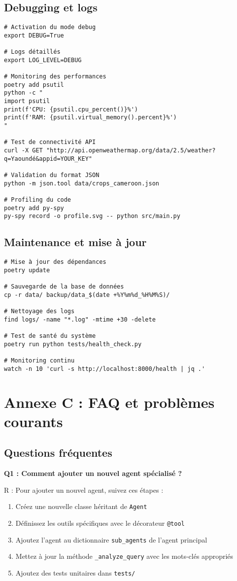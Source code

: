 \subsection{Debugging et logs}
\begin{verbatim}
# Activation du mode debug
export DEBUG=True

# Logs détaillés
export LOG_LEVEL=DEBUG

# Monitoring des performances
poetry add psutil
python -c "
import psutil
print(f'CPU: {psutil.cpu_percent()}%')
print(f'RAM: {psutil.virtual_memory().percent}%')
"

# Test de connectivité API
curl -X GET "http://api.openweathermap.org/data/2.5/weather?q=Yaoundé&appid=YOUR_KEY"

# Validation du format JSON
python -m json.tool data/crops_cameroon.json

# Profiling du code
poetry add py-spy
py-spy record -o profile.svg -- python src/main.py
\end{verbatim}

\subsection{Maintenance et mise à jour}
\begin{verbatim}
# Mise à jour des dépendances
poetry update

# Sauvegarde de la base de données
cp -r data/ backup/data_$(date +%Y%m%d_%H%M%S)/

# Nettoyage des logs
find logs/ -name "*.log" -mtime +30 -delete

# Test de santé du système
poetry run python tests/health_check.py

# Monitoring continu
watch -n 10 'curl -s http://localhost:8000/health | jq .'
\end{verbatim}

\section{Annexe C : FAQ et problèmes courants}

\subsection{Questions fréquentes}

\textbf{Q1 : Comment ajouter un nouvel agent spécialisé ?}

R : Pour ajouter un nouvel agent, suivez ces étapes :
\begin{enumerate}
    \item Créez une nouvelle classe héritant de \texttt{Agent}
    \item Définissez les outils spécifiques avec le décorateur \texttt{@tool}
    \item Ajoutez l'agent au dictionnaire \texttt{sub\_agents} de l'agent principal
    \item Mettez à jour la méthode \texttt{\_analyze\_query} avec les mots-clés appropriés
    \item Ajoutez des tests unitaires dans \texttt{tests/}
\end{enumerate}

